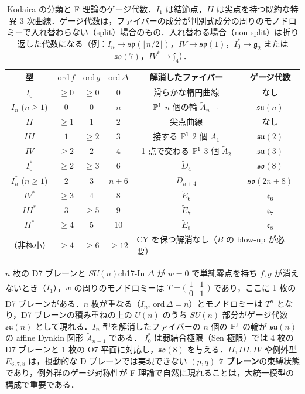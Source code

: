 \begin{table}[H]
\centering
\small
\setlength{\tabcolsep}{4pt}
\renewcommand{\arraystretch}{1.25}
\begin{tabular}{cccccc}
\hline
型 & $\mathrm{ord}\,f$ & $\mathrm{ord}\,g$ & $\mathrm{ord}\,\Delta$ & 解消したファイバー & ゲージ代数\\
\hline
$I_0$ & $\ge0$ & $\ge0$ & $0$ & 滑らかな楕円曲線 & なし\\
$I_n$ ($n\ge1$) & $0$ & $0$ & $n$ & $\mathbb{P}^1$ $n$ 個の輪 $\tilde A_{n-1}$ & $\mathfrak{su}(n)$\\
$II$ & $\ge1$ & $1$ & $2$ & 尖点曲線 & なし\\
$III$ & $1$ & $\ge2$ & $3$ & 接する $\mathbb{P}^1$ 2 個 $\tilde A_1$ & $\mathfrak{su}(2)$\\
$IV$ & $\ge2$ & $2$ & $4$ & 1 点で交わる $\mathbb{P}^1$ 3 個 $\tilde A_2$ & $\mathfrak{su}(3)$\\
$I_0^*$ & $\ge2$ & $\ge3$ & $6$ & $\tilde D_4$ & $\mathfrak{so}(8)$\\
$I_n^*$ ($n\ge1$) & $2$ & $3$ & $n+6$ & $\tilde D_{n+4}$ & $\mathfrak{so}(2n+8)$\\
$IV^*$ & $\ge3$ & $4$ & $8$ & $\tilde E_6$ & $\mathfrak{e}_6$\\
$III^*$ & $3$ & $\ge5$ & $9$ & $\tilde E_7$ & $\mathfrak{e}_7$\\
$II^*$ & $\ge4$ & $5$ & $10$ & $\tilde E_8$ & $\mathfrak{e}_8$\\
\hline
（非極小） & $\ge4$ & $\ge6$ & $\ge12$ & \multicolumn{2}{l}{CY を保つ解消なし（$B$ の blow-up が必要）}\\
\hline
\end{tabular}
\caption{Kodaira の分類と F 理論のゲージ代数．$I_1$ は結節点，$II$ は尖点を持つ既約な特異 3 次曲線．ゲージ代数は，ファイバーの成分が判別式成分の周りのモノドロミーで入れ替わらない（split）場合のもの．入れ替わる場合（non-split）は折り返した代数になる（例：$I_n\to\mathfrak{sp}(\lfloor n/2\rfloor)$，$IV\to\mathfrak{sp}(1)$，$I_0^*\to\mathfrak{g}_2$ または $\mathfrak{so}(7)$，$IV^*\to\mathfrak{f}_4$）．}
\label{tab:ch17-kodaira}
\end{table}

\begin{myex}{$n$ 枚の D7 ブレーンと $SU(n)$}{ch17-In}
$\Delta$ が $w=0$ で単純零点を持ち $f,g$ が消えないとき（$I_1$），$w$ の周りのモノドロミーは $T=\bigl(\begin{smallmatrix}1&1\\0&1\end{smallmatrix}\bigr)$ であり，ここに 1 枚の D7 ブレーンがある．$n$ 枚が重なる（$I_n$, $\mathrm{ord}\,\Delta=n$）とモノドロミーは $T^n$ となり，D7 ブレーンの積み重ねの上の $U(n)$ のうち $SU(n)$ 部分がゲージ代数 $\mathfrak{su}(n)$ として現れる．$I_n$ 型を解消したファイバーの $n$ 個の $\mathbb{P}^1$ の輪が $\mathfrak{su}(n)$ の affine Dynkin 図形 $\tilde A_{n-1}$ である．
$I_0^*$ は弱結合極限（Sen 極限）では 4 枚の D7 ブレーンと 1 枚の O7 平面に対応し，$\mathfrak{so}(8)$ を与える．$II, III, IV$ や例外型 $E_{6,7,8}$ は，摂動的な D ブレーンでは実現できない \textbf{$(p,q)$ 7 ブレーン}の束縛状態であり，例外群のゲージ対称性が F 理論で自然に現れることは，大統一模型の構成で重要である．
\end{myex}

